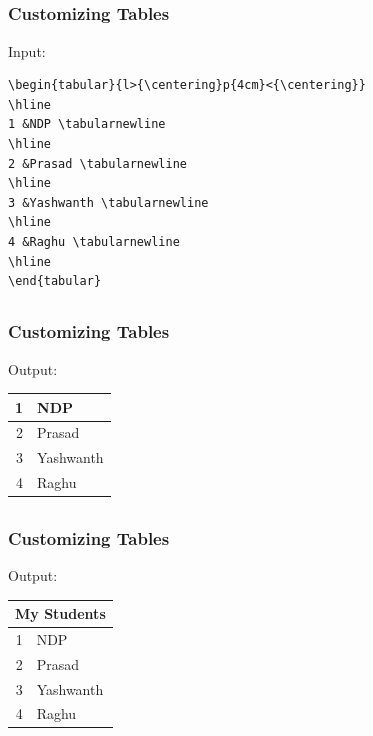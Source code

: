 \documentclass[12pt]{beamer}
\begin{document}
\begin{frame}[fragile]
\section{         }
\frametitle{Customizing Tables  }
Input:
\begin{verbatim}
\begin{tabular}{l>{\centering}p{4cm}<{\centering}}
\hline
1 &NDP \tabularnewline		
\hline
2 &Prasad \tabularnewline	
\hline
3 &Yashwanth \tabularnewline	
\hline
4 &Raghu \tabularnewline
\hline
\end{tabular}
\end{verbatim}

\end{frame}
\begin{frame}[fragile]
\section{         }
\frametitle{Customizing Tables  }
Output:\\
\begin{tabular}{|r|>{\centering}p{4cm}<{\centering}|}
	\hline
1 &NDP \tabularnewline	
	\hline
2 &Prasad\tabularnewline
	\hline		
3 &Yashwanth\tabularnewline
	\hline	
4 &Raghu\tabularnewline
	\hline
\end{tabular}
\end{frame}
\begin{frame}[fragile]
\section{         }
\frametitle{Customizing Tables  }
Output:\\
\begin{tabular}{|r|>{\centering}p{4cm}<{\centering}|}
	\hline
	\multicolumn{2}{|c|}{My Students} \\
	\hline
	1 &NDP \tabularnewline	
	\hline
	2 &Prasad\tabularnewline
	\hline		
	3 &Yashwanth\tabularnewline
	\hline	
	4 &Raghu\tabularnewline
	\hline
\end{tabular}
\end{frame}
\end{document}
